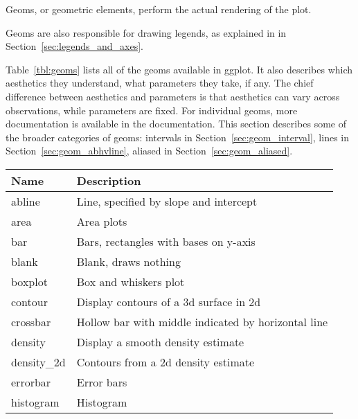Geoms, or geometric elements, perform the actual rendering of the plot.

Geoms are also responsible for drawing legends, as explained in in Section~\ref{sec:legends_and_axes}.

Table~\ref{tbl:geoms} lists all of the geoms available in ggplot.  It also describes which aesthetics they understand, what parameters they take, if any.  The chief difference between aesthetics and parameters is that aesthetics can vary across observations, while parameters are fixed.  For individual geoms, more documentation is available in the documentation.  This section describes some of the broader categories of geoms: intervals in Section~\ref{sec:geom_interval}, lines in Section~\ref{sec:geom_abhvline}, aliased in Section~\ref{sec:geom_aliased}.

\begin{table}
  \begin{center}
  \begin{tabular}{lp{3in}}
      \toprule
      Name & Description \\
      \midrule
      abline       & Line, specified by slope and intercept                                       \\
      area         & Area plots                                                                   \\
      bar          & Bars, rectangles with bases on y-axis                                        \\
      blank        & Blank, draws nothing                                                         \\
      boxplot      & Box and whiskers plot                                                        \\
      contour      & Display contours of a 3d surface in 2d                                       \\
      crossbar     & Hollow bar with middle indicated by horizontal line                          \\
      density      & Display a smooth density estimate                                            \\
      density\_2d & Contours from a 2d density estimate                                          \\
      errorbar     & Error bars                                                                   \\
      histogram    & Histogram                                                                    \\

\end{tabular}
\end{center}
\end{table}
